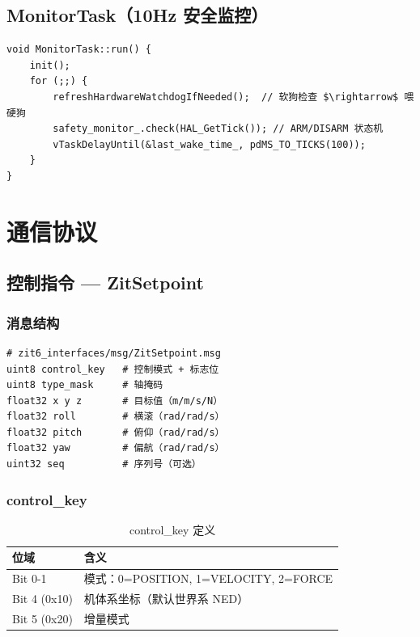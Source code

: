 \documentclass[12pt,a4paper]{article}
\begin{document}
\subsection{MonitorTask（10Hz 安全监控）}

\begin{lstlisting}[caption={MonitorTask 主循环}]
void MonitorTask::run() {
    init();
    for (;;) {
        refreshHardwareWatchdogIfNeeded();  // 软狗检查 $\rightarrow$ 喂硬狗
        safety_monitor_.check(HAL_GetTick()); // ARM/DISARM 状态机
        vTaskDelayUntil(&last_wake_time_, pdMS_TO_TICKS(100));
    }
}
\end{lstlisting}

\section{通信协议}

\subsection{控制指令 — ZitSetpoint}

\subsubsection{消息结构}

\begin{lstlisting}[caption={ZitSetpoint 消息定义}]
# zit6_interfaces/msg/ZitSetpoint.msg
uint8 control_key   # 控制模式 + 标志位
uint8 type_mask     # 轴掩码
float32 x y z       # 目标值（m/m/s/N）
float32 roll        # 横滚（rad/rad/s）
float32 pitch       # 俯仰（rad/rad/s）
float32 yaw         # 偏航（rad/rad/s）
uint32 seq          # 序列号（可选）
\end{lstlisting}

\subsubsection{control\_key}

\begin{table}[H]
\centering
\begin{tabularx}{\textwidth}{lX}
\toprule
\textbf{位域} & \textbf{含义} \\
\midrule
Bit 0-1 & 模式：0=POSITION, 1=VELOCITY, 2=FORCE \\
Bit 4 (0x10) & 机体系坐标（默认世界系 NED） \\
Bit 5 (0x20) & 增量模式 \\
\bottomrule
\end{tabularx}
\caption{control\_key 定义}
\end{table}
\end{document}
